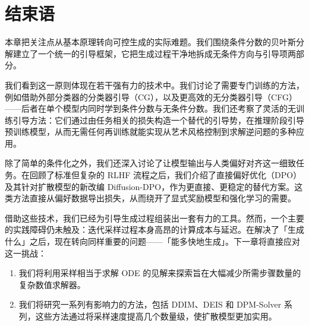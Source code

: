 \section{结束语}\label{sec:ch8_cr}

本章把关注点从基本原理转向可控生成的实际难题。我们围绕条件分数的贝叶斯分解建立了一个统一的引导框架，它把生成过程干净地拆成无条件方向与引导项两部分。

我们看到这一原则体现在若干强有力的技术中。我们讨论了需要专门训练的方法，例如借助外部分类器的分类器引导（CG），以及更高效的无分类器引导（CFG）——后者在单个模型内同时学到条件分数与无条件分数。我们还考察了灵活的无训练引导方法：它们通过由任务相关的损失构造一个替代的引导势，在推理阶段引导预训练模型，从而无需任何再训练就能实现从艺术风格控制到求解逆问题的多种应用。

除了简单的条件化之外，我们还深入讨论了让模型输出与人类偏好对齐这一细致任务。在回顾了标准但复杂的 RLHF 流程之后，我们介绍了直接偏好优化（DPO）及其针对扩散模型的新改编 Diffusion-DPO，作为更直接、更稳定的替代方案。这类方法直接从偏好数据导出损失，从而绕开了显式奖励模型和强化学习的需要。

借助这些技术，我们已经为引导生成过程组装出一套有力的工具。然而，一个主要的实践障碍仍未触及：迭代采样过程本身高昂的计算成本与延迟。在解决了「生成什么」之后，现在转向同样重要的问题——「能多快地生成」。下一章将直接应对这一挑战：
\begin{enumerate}
    \item 我们将利用采样相当于求解 ODE 的见解来探索旨在大幅减少所需步骤数量的复杂数值求解器。
    \item 我们将研究一系列有影响力的方法，包括 DDIM、DEIS 和 DPM-Solver 系列，这些方法通过将采样速度提高几个数量级，使扩散模型更加实用。
\end{enumerate}